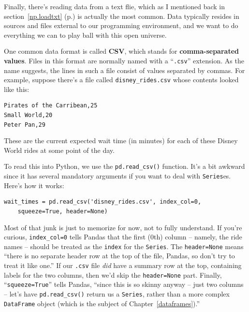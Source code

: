Finally, there's reading data from a text flie, which as I mentioned back in
section~\ref{np.loadtxt} (p.\pageref{np.loadtxt}) is actually the most common. 
Data typically resides in sources and files external to our programming
environment, and we want to do everything we can to play ball with this open
universe.


One common data format is called \textbf{CSV}, which stands for
\textbf{comma-separated values}. Files in this format are normally named with a
``\texttt{.csv}'' extension. As the name suggests, the lines in such a file
consist of values separated by commas. For example, suppose there's a file
called \texttt{disney\_rides.csv} whose contents looked like this:

\begin{Verbatim}[fontsize=\small,samepage=true,frame=lines,framesep=2mm]
Pirates of the Carribean,25
Small World,20
Peter Pan,29
\end{Verbatim}

These are the current expected wait time (in minutes) for each of these Disney
World rides at some point of the day.

\label{read_csv}

\smallskip
To read this into Python, we use the \texttt{pd.read\_csv()} function. It's a
bit awkward since it has several mandatory arguments if you want to deal with
\texttt{Series}es. Here's how it works:

\begin{Verbatim}[fontsize=\small,samepage=true,frame=single,framesep=3mm]
wait_times = pd.read_csv('disney_rides.csv', index_col=0,
    squeeze=True, header=None)
\end{Verbatim}


Most of that junk is just to memorize for now, not to fully understand. If
you're curious, \texttt{index\_col=0} tells Pandas that the first (0th) column
-- namely, the ride names -- should be treated as the \texttt{index} for the
\texttt{Series}. The \texttt{header=None} means ``there is no separate header
row at the top of the file, Pandas, so don't try to treat it like one.'' If our
\texttt{.csv} file \textit{did} have a summary row at the top, containing
labels for the two columns, then we'd skip the \texttt{header=None} part.
Finally, ``\texttt{squeeze=True}'' tells Pandas, ``since this is so skinny
anyway -- just two columns -- let's have \texttt{pd.read\_csv()} return us a
\texttt{Series}, rather than a more complex \texttt{DataFrame} object (which is
the subject of Chapter~\ref{dataframes}).''
